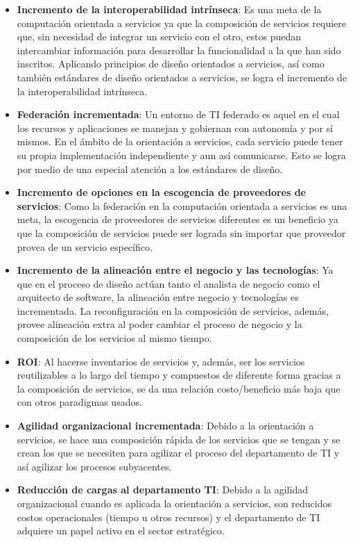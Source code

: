 \begin{itemize}
  \item \textbf{Incremento de la interoperabilidad intrínseca}: Es una meta de la computación orientada a servicios ya que la composición de servicios requiere que, sin necesidad de integrar un servicio con el otro, estos puedan intercambiar información para desarrollar la funcionalidad a la que han sido inscritos. Aplicando principios de diseño orientados a servicios, así como también estándares de diseño orientados a servicios, se logra el incremento de la interoperabilidad intrínseca.
  \item \textbf{Federación incrementada}: Un entorno de TI federado es aquel en el cual los recursos y aplicaciones se manejan y gobiernan con autonomía y por sí mismos. En el ámbito de la orientación a servicios, cada servicio puede tener su propia implementación independiente y aun así comunicarse. Esto se logra por medio de una especial atención a los estándares de diseño.
  \item \textbf{Incremento de opciones en la escogencia de proveedores de servicios}: Como la federación en la computación orientada a servicios es una meta, la escogencia de proveedores de servicios diferentes es un beneficio ya que la composición de servicios puede ser lograda sin importar que proveedor provea de un servicio específico.
  \item \textbf{Incremento de la alineación entre el negocio y las tecnologías}: Ya que en el proceso de diseño actúan tanto el analista de negocio como el arquitecto de software, la alineación entre negocio y tecnologías es incrementada. La reconfiguración en la composición de servicios, además, provee alineación extra al poder cambiar el proceso de negocio y la composición de los servicios al mismo tiempo.
  \item \textbf{ROI}: Al hacerse inventarios de servicios y, además, ser los servicios reutilizables a lo largo del tiempo y compuestos de diferente forma gracias a la composición de servicios, se da una relación costo/beneficio más baja que con otros paradigmas usados.
  \item \textbf{Agilidad organizacional incrementada}: Debido a la orientación a servicios, se hace una composición rápida de los servicios que se tengan y se crean los que se necesiten para agilizar el proceso del departamento de TI y así agilizar los procesos subyacentes.
  \item \textbf{Reducción de cargas al departamento TI}: Debido a la agilidad organizacional cuando es aplicada la orientación a servicios, son reducidos costos operacionales (tiempo u otros recursos) y el departamento de TI adquiere un papel activo en el sector estratégico.
\end{itemize}

